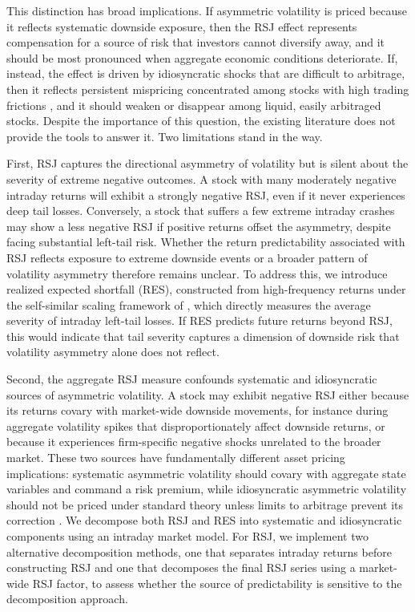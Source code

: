 \documentclass[11pt,a4paper]{article}
\begin{document}
This distinction has broad implications. If asymmetric volatility is priced because it reflects systematic downside exposure, then the RSJ effect represents compensation for a source of risk that investors cannot diversify away, and it should be most pronounced when aggregate economic conditions deteriorate. If, instead, the effect is driven by idiosyncratic shocks that are difficult to arbitrage, then it reflects persistent mispricing concentrated among stocks with high trading frictions \citep{shleifer1997,amihud2002}, and it should weaken or disappear among liquid, easily arbitraged stocks. Despite the importance of this question, the existing literature does not provide the tools to answer it. Two limitations stand in the way.
 
First, RSJ captures the directional asymmetry of volatility but is silent about the severity of extreme negative outcomes. A stock with many moderately negative intraday returns will exhibit a strongly negative RSJ, even if it never experiences deep tail losses. Conversely, a stock that suffers a few extreme intraday crashes may show a less negative RSJ if positive returns offset the asymmetry, despite facing substantial left-tail risk. Whether the return predictability associated with RSJ reflects exposure to extreme downside events or a broader pattern of volatility asymmetry therefore remains unclear. To address this, we introduce realized expected shortfall (RES), constructed from high-frequency returns under the self-similar scaling framework of \citet{Dimitriadis03072022}, which directly measures the average severity of intraday left-tail losses. If RES predicts future returns beyond RSJ, this would indicate that tail severity captures a dimension of downside risk that volatility asymmetry alone does not reflect.
 
Second, the aggregate RSJ measure confounds systematic and idiosyncratic sources of asymmetric volatility. A stock may exhibit negative RSJ either because its returns covary with market-wide downside movements, for instance during aggregate volatility spikes that disproportionately affect downside returns, or because it experiences firm-specific negative shocks unrelated to the broader market. These two sources have fundamentally different asset pricing implications: systematic asymmetric volatility should covary with aggregate state variables and command a risk premium, while idiosyncratic asymmetric volatility should not be priced under standard theory unless limits to arbitrage prevent its correction \citep{atilgan2020}. We decompose both RSJ and RES into systematic and idiosyncratic components using an intraday market model. For RSJ, we implement two alternative decomposition methods, one that separates intraday returns before constructing RSJ and one that decomposes the final RSJ series using a market-wide RSJ factor, to assess whether the source of predictability is sensitive to the decomposition approach.
 
\end{document}

